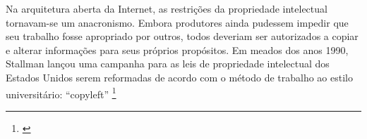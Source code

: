 {\begin{citacao}
Na arquitetura aberta da Internet, as restrições da propriedade intelectual tornavam-se um anacronismo. Embora produtores ainda pudessem impedir que seu trabalho fosse apropriado por outros, todos deveriam ser autorizados a copiar e alterar informações para seus próprios propósitos. Em meados dos anos 1990, Stallman lançou uma campanha para as leis de propriedade intelectual dos Estados Unidos serem reformadas de acordo com o método de trabalho ao estilo universitário: “copyleft” \footnote{\cite[368]{Barbrook2009}} \citeyear{Barbrook2009}
\end{citacao}







}
